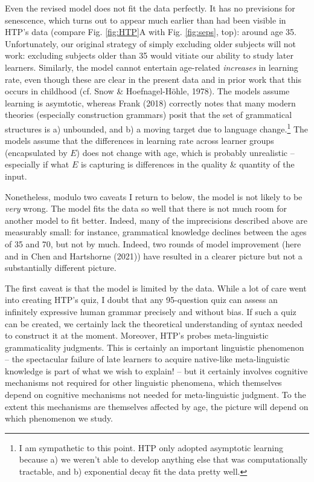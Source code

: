 \documentclass[
  english,
  doc,floatsintext]{apa6}
\begin{document}
Even the revised model does not fit the data perfectly. It has no previsions for senescence, which turns out to appear much earlier than had been visible in HTP's data (compare Fig. \ref{fig:HTP}A with Fig. \ref{fig:seps}, top): around age 35. Unfortunately, our original strategy of simply excluding older subjects will not work: excluding subjects older than 35 would vitiate our ability to study later learners. Similarly, the model cannot entertain age-related \emph{increases} in learning rate, even though these are clear in the present data and in prior work that this occurs in childhood (cf. Snow \& Hoefnagel-Höhle, 1978). The models assume learning is asymtotic, whereas Frank (2018) correctly notes that many modern theories (especially construction grammars) posit that the set of grammatical structures is a) unbounded, and b) a moving target due to language change.\footnote{I am sympathetic to this point. HTP only adopted asymptotic learning because a) we weren't able to develop anything else that was computationally tractable, and b) exponential decay fit the data pretty well.} The models assume that the differences in learning rate across learner groups (encapsulated by \(E\)) does not change with age, which is probably unrealistic -- especially if what \(E\) is capturing is differences in the quality \& quantity of the input.

Nonetheless, modulo two caveats I return to below, the model is not likely to be \emph{very} wrong. The model fits the data so well that there is not much room for another model to fit better. Indeed, many of the imprecisions described above are measurably small: for instance, grammatical knowledge declines between the ages of 35 and 70, but not by much. Indeed, two rounds of model improvement (here and in Chen and Hartshorne (2021)) have resulted in a clearer picture but not a substantially different picture.

The first caveat is that the model is limited by the data. While a lot of care went into creating HTP's quiz, I doubt that any 95-question quiz can assess an infinitely expressive human grammar precisely and without bias. If such a quiz can be created, we certainly lack the theoretical understanding of syntax needed to construct it at the moment. Moreover, HTP's probes meta-linguistic grammaticality judgments. This is certainly an important linguistic phenomenon -- the spectacular failure of late learners to acquire native-like meta-linguistic knowledge is part of what we wish to explain! -- but it certainly involves cognitive mechanisms not required for other linguistic phenomena, which themselves depend on cognitive mechanisms not needed for meta-linguistic judgment. To the extent this mechanisms are themselves affected by age, the picture will depend on which phenomenon we study.
\end{document}
